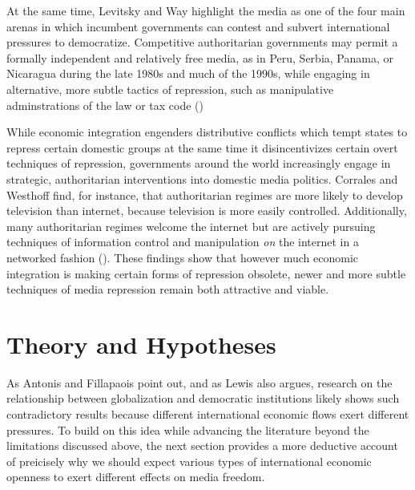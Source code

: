 \documentclass[12pt]{report}
\begin{document}
At the same time, Levitsky and Way highlight the media as one of the four main arenas in which
incumbent governments can contest and subvert international pressures to democratize. Competitive
authoritarian governments may permit a formally independent and relatively free media, as in Peru,
Serbia, Panama, or Nicaragua during the late 1980s and much of the 1990s, while engaging in
alternative, more subtle tactics of repression, such as manipulative adminstrations of the law or
tax code (\citealt[53,58]{Levitsky:2002gx})

While economic integration engenders distributive conflicts which tempt states to repress certain
domestic groups at the same time it disincentivizes certain overt techniques of repression,
governments around the world increasingly engage in strategic, authoritarian interventions into
domestic media politics. Corrales and Westhoff \citeyearpar{Corrales:2006vz} find, for instance,
that authoritarian regimes are more likely to develop television than internet, because television
is more easily controlled. Additionally, many authoritarian regimes welcome the internet but are
actively pursuing techniques of information control and manipulation \emph{on} the internet in a
networked fashion (\citealt{MacKinnon:2011id,Pearce:2012fm}). These findings show that however much
economic integration is making certain forms of repression obsolete, newer and more subtle
techniques of media repression remain both attractive and viable.

\section{Theory and Hypotheses}

As Antonis and Fillapaois point out, and as Lewis also argues, research on the relationship between
globalization and democratic institutions likely shows such contradictory results because different
international economic flows exert different pressures. To build on this idea while advancing the
literature beyond the limitations discussed above, the next section provides a more deductive
account of preicisely why we should expect various types of international economic openness to exert
different effects on media freedom.
\end{document}
